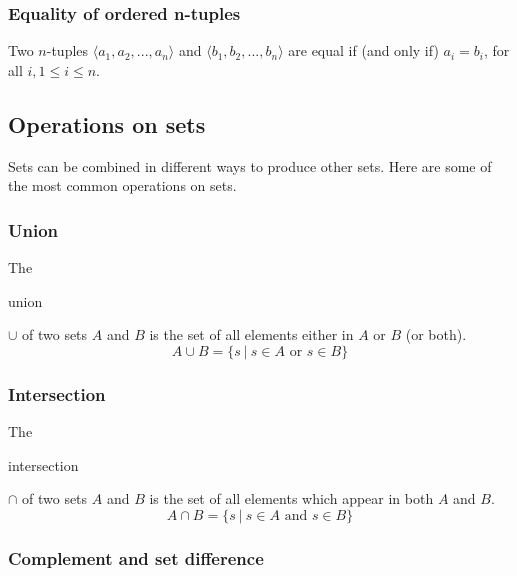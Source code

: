 \documentclass[11pt]{article}
\theoremstyle{plain}
\theoremstyle{definition}
\begin{document}
\subsubsection*{Equality of ordered n-tuples}

Two $ n $-tuples $ \langle a_1, a_2, ..., a_n \rangle $ and $ \langle b_1, b_2, ..., b_n \rangle $ are equal if (and only if) $ a_i = b_i $, for all $ i, 1 \le i \le n $.

\subsection*{Operations on sets}

Sets can be combined in different ways to produce other sets. Here are some of the most common operations on sets.

\subsubsection*{Union}

\begin{center}
  \def\svgwidth{0.3\columnwidth}
  
\end{center}

\noindent The \begin{em}union\end{em} $ \cup $ of two sets $ A $ and $ B $ is the set of all elements either in $ A $ or $ B $ (or both). 
$$ 
A \cup B = \{ s \ | \ s \in A \text{ or } s \in B \} 
$$

\subsubsection*{Intersection}

\begin{center}
  \def\svgwidth{0.3\columnwidth}
  
\end{center}

\noindent The \begin{em}intersection\end{em} $ \cap $ of two sets $ A $ and $ B $ is the set of all elements which appear in both $ A $ and $ B $. 
$$
A \cap B = \{ s \ | \ s \in A \text{ and } s \in B \} 
$$

\subsubsection*{Complement and set difference}
\end{document}
